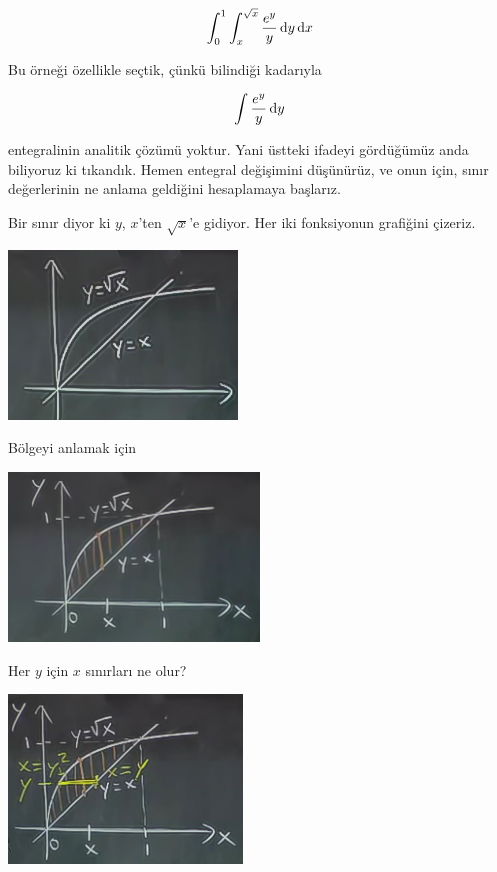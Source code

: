 \documentclass[12pt,fleqn]{article}\usepackage{../../common}
\begin{document}
$$ \int_0^1 \int_x^{\sqrt{x}} \frac{e^y}{y} \,\mathrm{d} y \,\mathrm{d} x $$

Bu örneği özellikle seçtik, çünkü bilindiği kadarıyla 

$$ \int \frac{e^y}{y} \,\mathrm{d} y $$

entegralinin analitik çözümü yoktur. Yani üstteki ifadeyi gördüğümüz anda
biliyoruz ki tıkandık. Hemen entegral değişimini düşünürüz, ve onun için,
sınır değerlerinin ne anlama geldiğini hesaplamaya başlarız. 

Bir sınır diyor ki $y$, $x$'ten $\sqrt{x}$'e gidiyor. Her iki fonksiyonun
grafiğini çizeriz. 

\begin{center}
\includegraphics[height=4.5cm]{16_13.png}
\end{center}

Bölgeyi anlamak için

\begin{center}
\includegraphics[height=4.5cm]{16_14.png}
\end{center}

Her $y$ için $x$ sınırları ne olur? 

\begin{center}
\includegraphics[height=4.5cm]{16_15.png}
\end{center}
\end{document}
